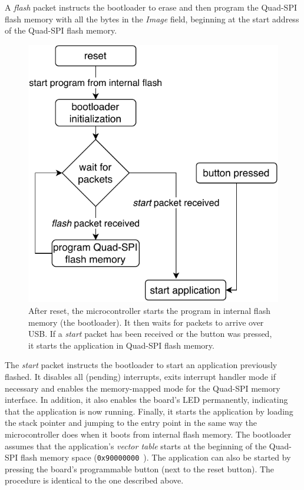 A \textit{flash} packet instructs the bootloader to erase and then program the Quad-SPI flash memory
with all the bytes in the \textit{Image} field, beginning at the start address of the Quad-SPI flash
memory.

\begin{figure}[ht]
    \centering
    \includegraphics[scale=1.0]{img/bootloader_flowchart.pdf}
    \caption[Bootloader program flow]{
        After reset, the microcontroller starts the program in internal flash memory (the bootloader).
        It then waits for packets to arrive over USB. If a \textit{start} packet has been received or
        the button was pressed, it starts the application in Quad-SPI flash memory.
    }
\end{figure}

The \textit{start} packet instructs the bootloader to start an application previously flashed. It
disables all (pending) interrupts, exits interrupt handler mode if necessary and enables the
memory-mapped mode for the Quad-SPI memory interface. In addition, it also enables the board's LED
permanently, indicating that the application is now running. Finally, it starts the application by
loading the stack pointer and jumping to the entry point in the same way the microcontroller does
when it boots from internal flash memory. The bootloader assumes that the application's \textit{vector table}
starts at the beginning of the Quad-SPI flash memory space (\lstinline{0x90000000}~\cite{mcu-ref-manual}).
The application can also be started by pressing the board's programmable button (next to the reset
button). The procedure is identical to the one described above.

